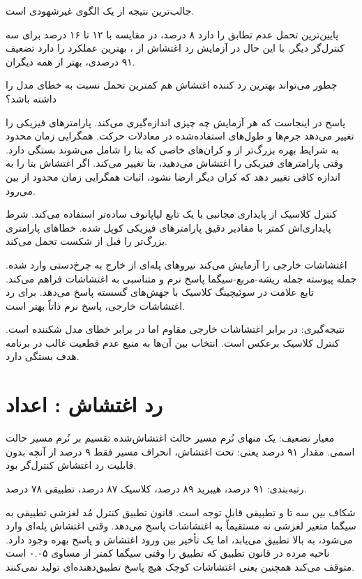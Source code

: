 \documentclass[12pt, a4paper]{article}
\newcommand{\dash}{\lr{---}}
\begin{document}
جالب‌ترين نتيجه از  يک الگوی غيرشهودی است.

 پايين‌ترين تحمل عدم تطابق را دارد \dash{} ۸ درصد، در مقايسه با ۱۲ تا ۱۶ درصد برای سه کنترل‌گر ديگر. با اين حال در آزمايش رد اغتشاش از ،  بهترين عملکرد را دارد \dash{} تضعيف ۹۱ درصدی، بهتر از همه ديگران.

چطور می‌تواند بهترين رد کننده اغتشاش هم کمترين تحمل نسبت به خطای مدل را داشته باشد؟

پاسخ در اينجاست که هر آزمايش چه چيزی اندازه‌گيری می‌کند.  پارامترهای فيزيکی را تغيير می‌دهد \dash{} جرم‌ها و طول‌های استفاده‌شده در معادلات حرکت. همگرايی زمان محدود  به شرايط بهره  بزرگ‌تر از  و کران‌های خاصی که بتا را شامل می‌شوند بستگی دارد. وقتی پارامترهای فيزيکی را اغتشاش می‌دهيد، بتا تغيير می‌کند. اگر اغتشاش بتا را به اندازه کافی تغيير دهد که کران  ديگر ارضا نشود، اثبات همگرايی زمان محدود از بين می‌رود.

کنترل کلاسيک از پايداری مجانبی با يک تابع لياپانوف ساده‌تر استفاده می‌کند. شرط پايداری‌اش کمتر با مقادير دقيق پارامترهای فيزيکی کوپل شده. خطاهای پارامتری بزرگ‌تر را قبل از شکست تحمل می‌کند.

 اغتشاشات خارجی را آزمايش می‌کند \dash{} نيروهای پله‌ای از خارج به چرخ‌دستی وارد شده. جمله پيوسته   \dash{} جمله ريشه-مربع-سيگما \dash{} پاسخ نرم و متناسبی به اغتشاشات فراهم می‌کند. تابع علامت در سوئيچينگ کلاسيک با جهش‌های گسسته پاسخ می‌دهد. برای رد اغتشاشات خارجی، پاسخ نرم  ذاتاً بهتر است.

نتيجه‌گيری:  در برابر اغتشاشات خارجی مقاوم اما در برابر خطای مدل شکننده است. کنترل کلاسيک برعکس است. انتخاب بين آن‌ها به منبع عدم قطعيت غالب در برنامه هدف بستگی دارد.

\section{رد اغتشاش : اعداد}

معيار تضعيف: يک منهای نُرم مسير حالت اغتشاش‌شده تقسيم بر نُرم مسير حالت اسمی. مقدار ۹۱ درصد يعنی: تحت اغتشاش، انحراف مسير فقط ۹ درصد از آنچه بدون قابليت رد اغتشاش کنترل‌گر بود.

رتبه‌بندی:  ۹۱ درصد، هيبريد ۸۹ درصد، کلاسيک ۸۷ درصد، تطبيقی ۷۸ درصد.

شکاف بين سه تا و تطبيقی قابل توجه است. قانون تطبيق کنترل مُد لغزشی تطبيقی به سيگما \dash{} متغير لغزشی \dash{} نه مستقيماً به اغتشاشات پاسخ می‌دهد. وقتی اغتشاش پله‌ای وارد می‌شود،  به بالا تطبيق می‌يابد، اما يک تأخير بين ورود اغتشاش و پاسخ بهره وجود دارد. ناحيه مرده در قانون تطبيق \dash{} که تطبيق را وقتی سيگما کمتر از  مساوی ۰.۰۵ است متوقف می‌کند \dash{} همچنين يعنی اغتشاشات کوچک هيچ پاسخ تطبيق‌دهنده‌ای توليد نمی‌کنند.
\end{document}
